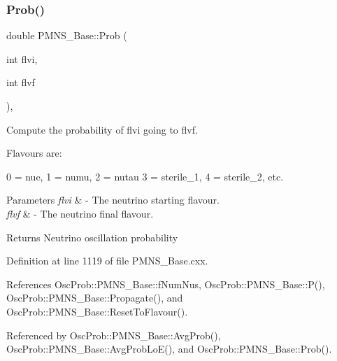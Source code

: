 \subsubsection{\texorpdfstring{Prob()}{Prob()}\hspace{0.1cm}{\footnotesize\ttfamily [1/3]}}
{\footnotesize\ttfamily double P\+M\+N\+S\+\_\+\+Base\+::\+Prob (\begin{DoxyParamCaption}\item[{int}]{flvi,  }\item[{int}]{flvf }\end{DoxyParamCaption})\hspace{0.3cm}{\ttfamily [virtual]}, {\ttfamily [inherited]}}

Compute the probability of flvi going to flvf.

Flavours are\+: 
\begin{DoxyPre}
  0 = nue, 1 = numu, 2 = nutau
  3 = sterile\_1, 4 = sterile\_2, etc.
\end{DoxyPre}
 
\begin{DoxyParams}{Parameters}
{\em flvi} & -\/ The neutrino starting flavour. \\
\hline
{\em flvf} & -\/ The neutrino final flavour.\\
\hline
\end{DoxyParams}
\begin{DoxyReturn}{Returns}
Neutrino oscillation probability 
\end{DoxyReturn}


Definition at line 1119 of file P\+M\+N\+S\+\_\+\+Base.\+cxx.



References Osc\+Prob\+::\+P\+M\+N\+S\+\_\+\+Base\+::f\+Num\+Nus, Osc\+Prob\+::\+P\+M\+N\+S\+\_\+\+Base\+::\+P(), Osc\+Prob\+::\+P\+M\+N\+S\+\_\+\+Base\+::\+Propagate(), and Osc\+Prob\+::\+P\+M\+N\+S\+\_\+\+Base\+::\+Reset\+To\+Flavour().



Referenced by Osc\+Prob\+::\+P\+M\+N\+S\+\_\+\+Base\+::\+Avg\+Prob(), Osc\+Prob\+::\+P\+M\+N\+S\+\_\+\+Base\+::\+Avg\+Prob\+Lo\+E(), and Osc\+Prob\+::\+P\+M\+N\+S\+\_\+\+Base\+::\+Prob().


